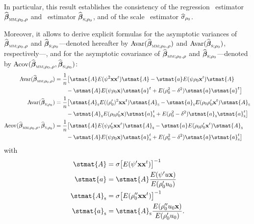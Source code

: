 In particular, this result establishes the consistency of the regression
~estimator $\sthat{\boldsymbol\beta}_{\stsc{MM};\rho_0,\rho}$ and
~estimator $\sthat{\boldsymbol\beta}_{\stsc{S};\rho_0}$, and of the
scale ~estimator $\widehat{\sigma}_{\rho_0}$.

Moreover, it allows to derive explicit formulas for the asymptotic variances
of $\sthat{\boldsymbol\beta}_{\stsc{MM};\rho_0,\rho}$ and
$\sthat{\boldsymbol\beta}_{\stsc{S};\rho_0}$---denoted hereafter by
$\mathrm{Avar}(\sthat{\boldsymbol\beta}_{\stsc{MM};\rho_0,\rho})$ and 
$\mathrm{Avar}(\sthat{\boldsymbol\beta}_{\stsc{S};\rho_0})$, respectively---, and for the asymptotic
covariance of $\sthat{\boldsymbol\beta}_{\stsc{MM};\rho_0,\rho}$ and
$\sthat{\boldsymbol\beta}_{\stsc{S};\rho_0}$---denoted by
$\mathrm{Acov}(\sthat{\boldsymbol\beta}_{\stsc{MM};\rho_0,\rho},
\sthat{\boldsymbol\beta}_{\stsc{S};\rho_0})$:
%
\begin{align}
    \label{eq:Avar_betahat_MM}
    \mathrm{Avar}(\sthat{\boldsymbol\beta}_{\stsc{MM};\rho_0,\rho})
    & = \frac{1}{n} \big[ \stmat{A} E(\psi^2\stvec{x}\stvec{x}^t)\stmat{A} 
        - \stmat{a} E(\psi\rho_0\stvec{x}^t) \stmat{A}
    \\\nonumber & \qquad 
        - \stmat{A} E(\psi\rho_0\stvec{x}) \stmat{a}^t 
        + E(\rho_0^2 - \delta^2)  \stmat{a}\stmat{a}^t \big]
    \\
    \label{eq:Avar_betahat_S}
    \mathrm{Avar}(\sthat{\boldsymbol\beta}_{\stsc{S};\rho_0})
    & = \frac{1}{n} \big[ \stmat{A}_\stsc{S} E((\rho_0')^2 \stvec{x}\stvec{x}^t) \stmat{A}_\stsc{S} 
        - \stmat{a}_\stsc{S} E(\rho_0\rho_0'\stvec{x}^t) \stmat{A}_\stsc{S}
    \\\nonumber & \qquad 
        - \stmat{A}_\stsc{S} E(\rho_0\rho_0'\stvec{x}) \stmat{a}_\stsc{S}^t 
        + E(\rho_0^2 - \delta^2) \stmat{a}_\stsc{S}\stmat{a}_\stsc{S}^t \big]
    \\
    \label{eq:Acov_betahat_MM_S}
    \mathrm{Acov}(\sthat{\boldsymbol\beta}_{\stsc{MM};\rho_0,\rho},
        \sthat{\boldsymbol\beta}_{\stsc{S};\rho_0})
    & = \frac{1}{n} \big[ \stmat{A} E(\psi\rho_0'\stvec{x}\stvec{x}^t) \stmat{A}_\stsc{S}
        - \stmat{a} E(\rho_0\rho_0'\stvec{x}^t) \stmat{A}_\stsc{S}
    \\\nonumber & \qquad 
        - \stmat{A} E(\psi\rho_0\stvec{x}) \stmat{a}_\stsc{S}^t
        + E(\rho_0^2 - \delta^2) \stmat{a}\stmat{a}_\stsc{S}^t \big]
\end{align}
%
with
%
\begin{align}
    \label{eq:A}
    \stmat{A} &  = \sigma \left[ E(\psi'\stvec{x}\stvec{x}^t)\right]^{-1}
    \\
    \label{eq:a}
    \stmat{a} &  = \stmat{A} \frac{E(\psi'u\stvec{x})}{E(\rho_0'u_0)}
    \\
    \label{eq:A_S}
    \stmat{A}_\stsc{S} & = \sigma\left[E(\rho_0''\stvec{x}\stvec{x}^t)\right]^{-1}
    \\
    \label{eq:a_S}
    \stmat{a}_\stsc{S} & = \stmat{A}_\stsc{S}\frac{E(\rho_0''u_0\stvec{x})}{E(\rho_0'u_0)}.
\end{align}

